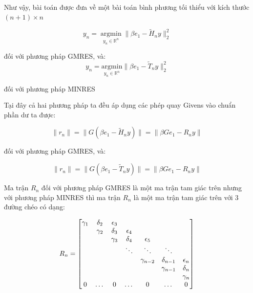 \documentclass[14pt, a4paper]{article}
\numberwithin{equation}{section}
\numberwithin{algorithm}{section}
\numberwithin{figure}{section}
\numberwithin{dl}{section}
\numberwithin{md}{section}
\numberwithin{bd}{section}
\numberwithin{dn}{section}
\begin{document}
Như vậy, bài toán được đưa về một bài toán bình phương tối thiểu với kích thước $(n+1)\times n$

\begin{equation}
    y_n = \operatorname*{argmin}_{y_n \in \mathbb{R}^{n}} \lVert \beta e_1 - \widetilde{H}_n y\rVert_2^2
\end{equation}

đối với phương pháp GMRES, và:
\begin{equation}
    y_n = \underset{y_n \in \mathbb{R}^{n}}{\mathrm{argmin}} \lVert \beta e_1 - \widetilde{T}_n y\rVert_2^2
\end{equation}

đối với phương pháp MINRES

Tại đây cả hai phương pháp ta đều áp dụng các phép quay Givens vào chuẩn phần dư ta được:

\begin{equation}
    \lVert r_n \rVert = \lVert G(\beta e_1 - \widetilde{H}_n y) \rVert = \lVert \beta G e_1 - R_n y \rVert
\end{equation}

đối với phương pháp GMRES, và:

\begin{equation}
    \lVert r_n \rVert = \lVert G(\beta e_1 - \widetilde{T}_n y) \rVert = \lVert \beta G e_1 - R_n y \rVert
\end{equation}

Ma trận $R_n$ đối với phương pháp GMRES là một ma trận tam giác trên nhưng với phương pháp MINRES thì ma trận $R_n$ là một ma trận tam giác trên với 3 đường chéo có dạng:

\begin{equation}
    R_n = \begin{bmatrix}
        \gamma_1 & \delta_2 & \epsilon_3 & \space & \space & \space & \space \\
        \space & \gamma_2 & \delta_3 & \epsilon_4 & \space & \space & \space \\
        \space & \space  & \gamma_3 & \delta_4 & \epsilon_5 & \space & \space \\
        \space & \space & \space & \ddots & \ddots & \ddots & \space \\
        \space & \space & \space & \space & \gamma_{n-2} & \delta_{n-1} & \epsilon_n \\
        \space & \space & \space & \space & \space & \gamma_{n-1} & \delta_n \\
        \space & \space & \space & \space & \space & \space & \gamma_n \\
        0 & \dots & 0 & \dots & 0 & \dots & 0
    \end{bmatrix}
\end{equation}
\end{document}
